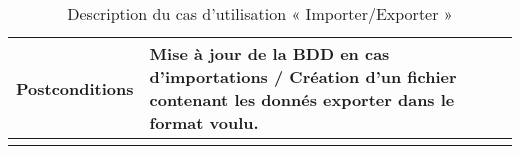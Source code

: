 \begin{longtable}{|p{4cm}|p{12cm}|}
                    \hline
                    Postconditions &  Mise à jour de la BDD en cas d’importations / Création d’un fichier contenant les donnés exporter dans le format voulu.
                    \\
                    \hline
                    \caption{Description du cas d'utilisation « Importer/Exporter »}\\
            \end{longtable}     
            
            
   
